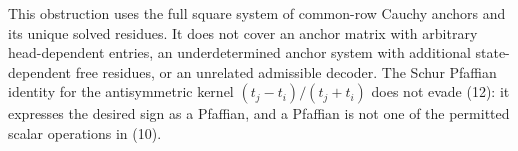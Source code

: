 \documentclass[11pt]{article}
\begin{document}
This obstruction uses the full square system of common-row Cauchy
anchors and its unique solved residues. It does not cover an anchor
matrix with arbitrary head-dependent entries, an underdetermined
anchor system with additional state-dependent free residues, or an
unrelated admissible decoder. The Schur Pfaffian identity for the
antisymmetric kernel $(t_j-t_i)/(t_j+t_i)$ does not evade (12): it
expresses the desired sign as a Pfaffian, and a Pfaffian is not one of
the permitted scalar operations in (10).
\end{document}
